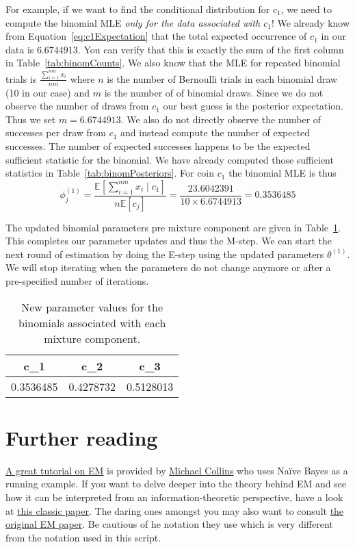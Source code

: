 \documentclass[a4paper,11pt,leqno]{report}\usepackage[]{graphicx}\usepackage[]{color}
\newcommand{\E}{\mathbb{E}}
\begin{document}
For example, if we want to find the conditional distribution for $ c_{1} $, we need to compute the binomial MLE \textit{only
for the data associated with $ c_{1} $}! We already know from Equation~\eqref{eq:c1Expectation} that the total expected 
occurrence of $ c_{1} $ in our data is $ 6.6744913 $. You can verify that this is exactly the sum of the first column in
Table~\ref{tab:binomCounts}. We also know that the MLE for repeated binomial trials is $ \frac{\sum^{nm}_{i=1}x_{i}}{nm} $ where
$ n $ is the number of Bernoulli trials in each binomial draw (10 in our case) and $ m $ is the number of of binomial draws. Since we do
not observe the number of draws from $ c_{1} $ our best guess is the posterior expectation. Thus we set $ m = 6.6744913 $. We also do not
directly observe the number of successes per draw from $ c_{1} $ and instead compute the number of expected successes. The number of 
expected successes happens to be the expected sufficient statistic for the binomial. We have already computed those sufficient statistics
in Table~\ref{tab:binomPosteriors}. For coin $ c_{1} $ the binomial MLE is thus
\begin{equation}
\phi_{j}^{(1)} =  \frac{\E\left[\sum_{i=1}^{nm} x_{i}\mid c_{1}\right]}{n\E\left[c_{j}\right]} 
= \frac{23.6042391}{10 \times 6.6744913}
= 0.3536485
\end{equation}

The updated binomial parameters pre mixture component are given in Table~\ref{tab:newBinoms}. This completes our parameter
updates and thus the M-step. We can start the next round of estimation by doing the E-step using the
updated parameters $ \theta^{(1)} $. We will stop iterating when the parameters do not change anymore or
after a pre-specified number of iterations.

\begin{table}
\center

\begin{tabular}{c|c|c}
\hline
c\_1 & c\_2 & c\_3\\
\hline
0.3536485 & 0.4278732 & 0.5128013\\
\hline
\end{tabular}


\caption{New parameter values for the binomials associated with each mixture component.}
\label{tab:newBinoms}
\end{table}

\section*{Further reading}
\href{http://www.cs.columbia.edu/~mcollins/em.pdf}{A great tutorial on EM} is provided by \href{http://www.cs.columbia.edu/~mcollins/}{Michael Collins} who
uses Na\"ive Bayes as a running example. If you want to delve deeper into the theory behind EM and see how it can be interpreted from an information-theoretic
perspective, have a look at \href{http://www.cs.toronto.edu/~fritz/absps/emk.pdf}{this classic paper}. The daring ones amongst you may also want to consult
\href{http://web.mit.edu/6.435/www/Dempster77.pdf}{the original EM paper}. Be cautious of he notation they use which is very different from the notation
used in this script.
\end{document}
